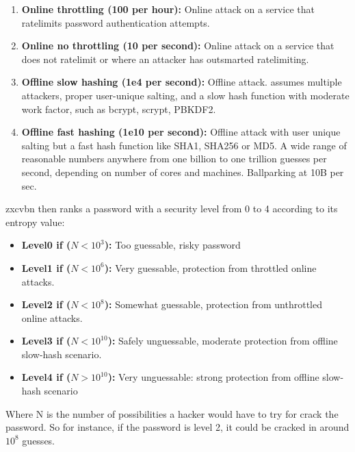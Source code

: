 \begin{enumerate}
\setlength\itemsep{0pt}

\item \textbf{Online throttling (100 per hour):} Online attack on a service that ratelimits password authentication  attempts.
  
\item \textbf{Online no throttling (10 per second): }Online attack on a service that does not ratelimit or where an attacker has outsmarted ratelimiting.

\item \textbf{Offline slow hashing (1e4 per second): }Offline attack. assumes multiple attackers, proper user-unique salting, and a slow hash function with moderate work factor, such as bcrypt, scrypt, PBKDF2.

\item \textbf{Offline fast hashing (1e10 per second): }Offline attack with user unique salting but a fast hash function like SHA1, SHA256 or MD5. A wide range of reasonable numbers anywhere from one billion to one trillion guesses per second, depending on number of cores and machines. Ballparking at 10B per sec.

\end{enumerate}

%
%
%
%

zxcvbn then ranks a password with a security level from 0 to 4 according to its entropy value:
\begin{itemize}
\setlength\itemsep{0pt}
\item \textbf{Level0 if ($N<10^{3}$):} Too guessable, risky password
\item \textbf{Level1 if ($N<10^{6}$):} Very guessable, protection from throttled online attacks.
\item \textbf{Level2 if ($N<10^{8}$):} Somewhat guessable, protection from unthrottled online attacks.
\item \textbf{Level3 if ($N<10^{10}$):} Safely unguessable, moderate protection from offline slow-hash scenario.
\item \textbf{Level4 if ($N>10^{10}$):} Very unguessable: strong protection from offline slow-hash scenario

\end{itemize}
Where N is the number of possibilities a hacker would have to try for crack the password. So for instance, if the password is level 2, it could be cracked in around $10^{8}$ guesses.

